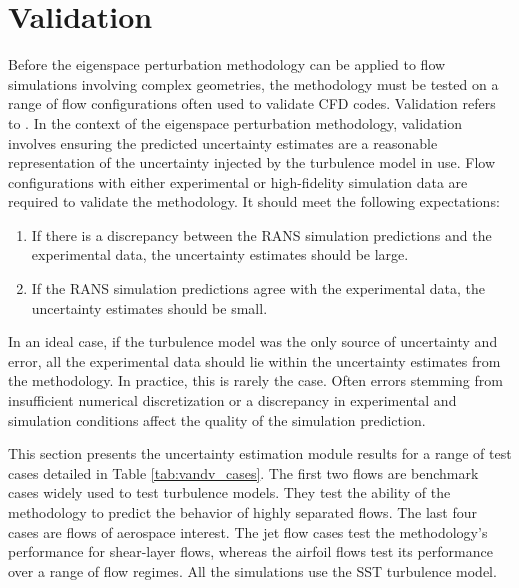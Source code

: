 \section{Validation} \label{sec:VandV_rans_uq}

Before the eigenspace perturbation methodology can be applied to flow simulations involving complex geometries, the methodology must be tested on a range of flow configurations often used to validate CFD codes. 
Validation refers to  \cite{computational_fluid_dynamics_committee_guide_1998}.
In the context of the eigenspace perturbation methodology, validation involves ensuring the predicted uncertainty estimates are a reasonable representation of the uncertainty injected by the turbulence model in use.
Flow configurations with either experimental or high-fidelity simulation data are required to validate the methodology.
It should meet the following expectations:

\begin{enumerate}
    \item If there is a discrepancy between the RANS simulation predictions and the experimental data, the uncertainty estimates should be large.
    \item If the RANS simulation predictions agree with the experimental data, the uncertainty estimates should be small. 
\end{enumerate}

In an ideal case, if the turbulence model was the only source of uncertainty and error, all the experimental data should lie within the uncertainty estimates from the methodology.
In practice, this is rarely the case.
Often errors stemming from insufficient numerical discretization or a discrepancy in experimental and simulation conditions affect the quality of the simulation prediction. 

This section presents the uncertainty estimation module results for a range of test cases detailed in Table \ref{tab:vandv_cases}.
The first two flows are benchmark cases widely used to test turbulence models.
They test the ability of the methodology to predict the behavior of highly separated flows.
The last four cases are flows of aerospace interest.
The jet flow cases test the methodology's performance for shear-layer flows, whereas the airfoil flows test its performance over a range of flow regimes.
All the simulations use the SST turbulence model\cite{sst}.


